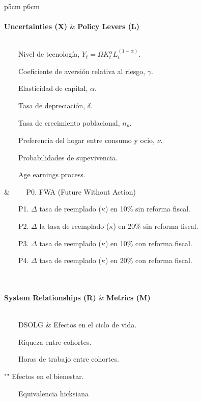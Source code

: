\documentclass[preview]{standalone}
\newcommand{\tabitem}{~~\llap{\textbullet}~~}
\begin{document}
\sffamily



\begin{longtable}{p{5cm} p{6cm}}  
\\[-1.8ex]\hline 
\endhead
\hline \\[-1.8ex] 
 \textbf{Uncertainties (X)} &  {\textbf{Policy Levers (L)}}   \\ 
\hline \\[-1ex] 

\par\tabitem Nivel de tecnología, $Y_t = \Omega K_t^\alpha L_t^{(1-\alpha)}$.
\par\tabitem Coeficiente de aversión relativa al riesgo, $\gamma$.
\par\tabitem Elasticidad de capital, $\alpha$.
\par\tabitem Tasa de depreciación, $\delta$.
\par\tabitem Tasa de crecimiento poblacional, $n_p$.
\par\tabitem Preferencia del hogar entre consumo y ocio, $\nu$.
\par\tabitem Probabilidades de supevivencia.
\par\tabitem Age earnings process.


 & \tabitem P0. FWA (Future Without Action)
 \par\tabitem P1. $\Delta$ tasa de reemplado ($\kappa$) en 10\% sin reforma fiscal. 
 \par\tabitem P2. $\Delta$ la tasa de reemplado ($\kappa$) en 20\% sin reforma fiscal.
 \par\tabitem P3. $\Delta$ tasa de reemplado ($\kappa$) en 10\% con reforma fiscal. 
 \par\tabitem P4. $\Delta$ tasa de reemplado ($\kappa$) en 20\% con reforma fiscal.

 \\
 
 \\[-1.8ex]\hline 
\endhead
	 \textbf{System Relationships (R)} &  {\textbf{Metrics (M)}}   \\ 
	 \hline \\[-1ex] 

	\par\tabitem DSOLG &
	Efectos en el ciclo de vida.
	\par\tabitem Riqueza entre cohortes.
	\par\tabitem Horas de trabajo entre cohortes.
	\par ""
	Efectos en el bienestar.
	\par\tabitem Equivalencia hicksiana\\
\hline 
\hline \\[-1.8ex] 

\end{longtable} 
\end{document}
